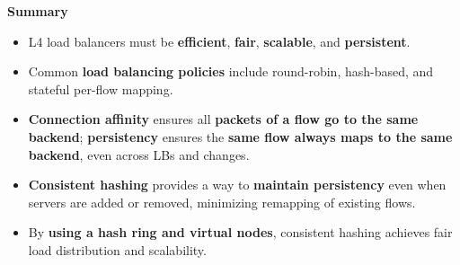 \begin{flushleft}
    \textcolor{Green3}{ \textbf{Summary}}
\end{flushleft}
\begin{itemize}
    \item L4 load balancers must be \textbf{efficient}, \textbf{fair}, \textbf{scalable}, and \textbf{persistent}.
    \item Common \textbf{load balancing policies} include round-robin, hash-based, and stateful per-flow mapping.
    \item \textbf{Connection affinity} ensures all \textbf{packets of a flow go to the same backend}; \textbf{persistency} ensures the \textbf{same flow always maps to the same backend}, even across LBs and changes.
    \item \textbf{Consistent hashing} provides a way to \textbf{maintain persistency} even when servers are added or removed, minimizing remapping of existing flows.
    \item By \textbf{using a hash ring and virtual nodes}, consistent hashing achieves fair load distribution and scalability.
\end{itemize}
